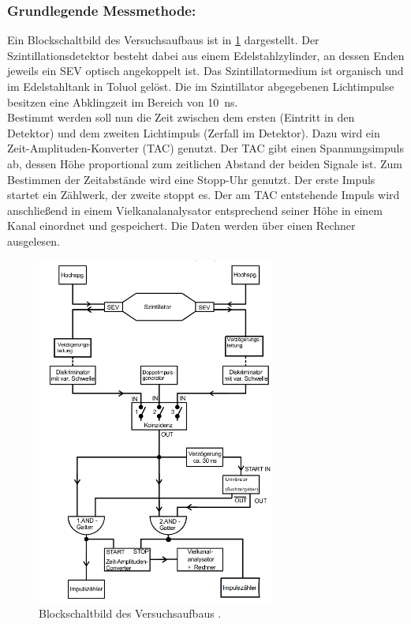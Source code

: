   \subsubsection{Grundlegende Messmethode:}
  	Ein Blockschaltbild des Versuchsaufbaus ist in \ref{fig:aufbau} dargestellt.
  	Der Szintillationsdetektor besteht dabei aus einem Edelstahlzylinder, an dessen
  	Enden jeweils ein SEV optisch angekoppelt ist. Das Szintillatormedium ist organisch
  	und im Edelstahltank in Toluol gelöst. Die im Szintillator abgegebenen Lichtimpulse besitzen eine
  	Abklingzeit im Bereich von \SI{10}{\nano\second}.\\
  	Bestimmt werden soll nun die Zeit zwischen dem ersten (Eintritt in den
  	Detektor) und dem zweiten Lichtimpuls (Zerfall im Detektor). Dazu wird ein
  	Zeit-Amplituden-Konverter (TAC) genutzt. Der TAC gibt einen Spannungsimpuls ab,
  	dessen Höhe proportional zum zeitlichen Abstand der
  	beiden Signale ist. Zum Bestimmen der Zeitabstände wird eine Stopp-Uhr genutzt.
    Der erste Impuls startet ein Zählwerk, der zweite stoppt es.
    Der am TAC entstehende Impuls wird anschließend in einem Vielkanalanalysator
  	entsprechend seiner Höhe in einem Kanal einordnet und gespeichert.
  	Die Daten werden über einen Rechner ausgelesen.
  	\begin{figure}[p]
    	\centering
    	\includegraphics[width=0.7\textwidth]{Bilder/AufbauB.png}
    	\caption{Blockschaltbild des Versuchsaufbaus \cite{anleitung}.}
    	\label{fig:aufbau}
  	\end{figure}
